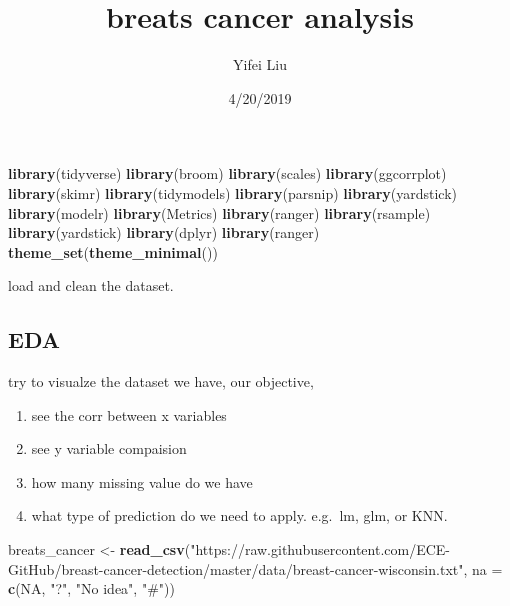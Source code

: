 \documentclass[]{article}
\title{breats cancer analysis}
\author{Yifei Liu}
\date{4/20/2019}
\newenvironment{Shaded}{\begin{snugshade}}{\end{snugshade}}
\newcommand{\DataTypeTok}[1]{\textcolor[rgb]{0.13,0.29,0.53}{#1}}
\newcommand{\KeywordTok}[1]{\textcolor[rgb]{0.13,0.29,0.53}{\textbf{#1}}}
\newcommand{\NormalTok}[1]{#1}
\newcommand{\OtherTok}[1]{\textcolor[rgb]{0.56,0.35,0.01}{#1}}
\newcommand{\StringTok}[1]{\textcolor[rgb]{0.31,0.60,0.02}{#1}}
\providecommand{\tightlist}{%
  \setlength{\itemsep}{0pt}\setlength{\parskip}{0pt}}
\begin{document}
\maketitle

\begin{Shaded}
\begin{Highlighting}[]
\KeywordTok{library}\NormalTok{(tidyverse)}
\KeywordTok{library}\NormalTok{(broom)}
\KeywordTok{library}\NormalTok{(scales)}
\KeywordTok{library}\NormalTok{(ggcorrplot)}
\KeywordTok{library}\NormalTok{(skimr)}
\KeywordTok{library}\NormalTok{(tidymodels)}
\KeywordTok{library}\NormalTok{(parsnip)}
\KeywordTok{library}\NormalTok{(yardstick)}
\KeywordTok{library}\NormalTok{(modelr)}
\KeywordTok{library}\NormalTok{(Metrics)}
\KeywordTok{library}\NormalTok{(ranger)}
\KeywordTok{library}\NormalTok{(rsample)}
\KeywordTok{library}\NormalTok{(yardstick)}
\KeywordTok{library}\NormalTok{(dplyr)}
\KeywordTok{library}\NormalTok{(ranger)}
\KeywordTok{theme_set}\NormalTok{(}\KeywordTok{theme_minimal}\NormalTok{())}
\end{Highlighting}
\end{Shaded}

load and clean the dataset.

\hypertarget{eda}{%
\subsection{EDA}\label{eda}}

try to visualze the dataset we have, our objective,

\begin{enumerate}
\def\labelenumi{\arabic{enumi}.}
\tightlist
\item
  see the corr between x variables
\item
  see y variable compaision
\item
  how many missing value do we have
\item
  what type of prediction do we need to apply. e.g.~lm, glm, or KNN.
\end{enumerate}

\begin{Shaded}
\begin{Highlighting}[]
\NormalTok{breats_cancer <-}\StringTok{ }\KeywordTok{read_csv}\NormalTok{(}\StringTok{"https://raw.githubusercontent.com/ECE-GitHub/breast-cancer-detection/master/data/breast-cancer-wisconsin.txt"}\NormalTok{, }\DataTypeTok{na =} \KeywordTok{c}\NormalTok{(}\OtherTok{NA}\NormalTok{, }\StringTok{"?"}\NormalTok{, }\StringTok{"No idea"}\NormalTok{, }\StringTok{"#"}\NormalTok{))}
\end{Highlighting}
\end{Shaded}
\end{document}

